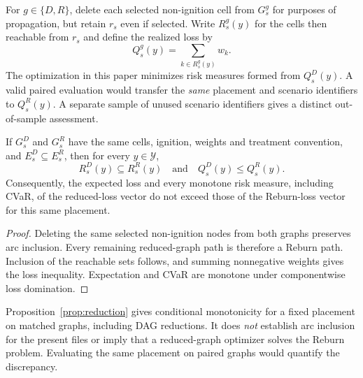 For $g\in\{D,R\}$, delete each selected non-ignition cell from $G_s^g$
for purposes of propagation, but retain $r_s$ even if selected. Write
$R_s^g(y)$ for the cells then reachable from $r_s$ and define the realized
loss by
\begin{equation}\label{eq:loss}
 Q_s^g(y)=\sum_{k\in R_s^g(y)}w_k.
\end{equation}
The optimization in this paper minimizes risk measures formed from
$Q_s^D(y)$. A valid paired evaluation would transfer the \emph{same}
placement and scenario identifiers to $Q_s^R(y)$. A separate sample of
unused scenario identifiers gives a distinct out-of-sample assessment.

\begin{proposition}\label{prop:reduction}
If $G_s^D$ and $G_s^R$ have the same cells, ignition, weights and treatment
convention, and $E_s^D\subseteq E_s^R$, then for every $y\in\mathcal Y$,
\begin{equation}\label{eq:graph-monotonicity}
 R_s^D(y)\subseteq R_s^R(y)
 \quad\text{and}\quad Q_s^D(y)\le Q_s^R(y).
\end{equation}
Consequently, the expected loss and every monotone risk measure, including
CVaR, of the reduced-loss vector do not exceed those of the Reburn-loss vector
for this same placement.
\end{proposition}
\begin{proof}
Deleting the same selected non-ignition nodes from both graphs preserves
arc inclusion. Every remaining reduced-graph path is therefore a Reburn path.
Inclusion of the reachable sets follows, and summing nonnegative weights
gives the loss inequality. Expectation and CVaR are monotone under
componentwise loss domination.
\end{proof}

Proposition~\ref{prop:reduction} gives conditional monotonicity for a
fixed placement on matched graphs, including DAG reductions. It does
\emph{not} establish arc inclusion for the present files or imply that
a reduced-graph optimizer solves the Reburn problem. Evaluating the
same placement on paired graphs would quantify the discrepancy.
